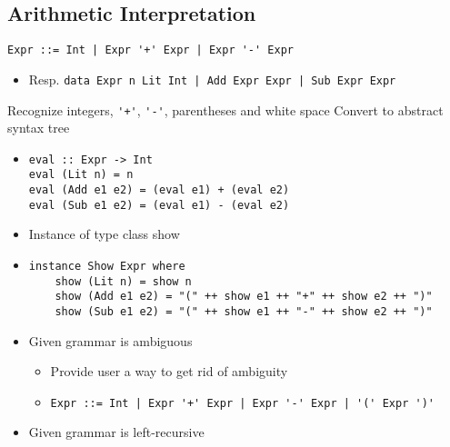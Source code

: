 \subsection{Arithmetic Interpretation}
\begin{itemize}
        \begin{itemize}
             \verb/Expr ::= Int | Expr '+' Expr | Expr '-' Expr/
                \begin{itemize}
                    \item Resp. \verb+data Expr n Lit Int | Add Expr Expr | Sub Expr Expr+
                \end{itemize}
             Recognize integers, \verb/'+'/, \verb/'-'/, parentheses and white space
             Convert to abstract syntax tree
        \end{itemize}
        \begin{itemize}
            \item
\begin{verbatim}
eval :: Expr -> Int
eval (Lit n) = n
eval (Add e1 e2) = (eval e1) + (eval e2)
eval (Sub e1 e2) = (eval e1) - (eval e2)
\end{verbatim}
        \end{itemize}
        \begin{itemize}
            \item Instance of type class show
            \item
\begin{verbatim}
instance Show Expr where
    show (Lit n) = show n
    show (Add e1 e2) = "(" ++ show e1 ++ "+" ++ show e2 ++ ")"
    show (Sub e1 e2) = "(" ++ show e1 ++ "-" ++ show e2 ++ ")"
\end{verbatim}
        \end{itemize}
        \begin{itemize}
            \item Given grammar is ambiguous
                \begin{itemize}
                    \item Provide user a way to get rid of ambiguity
                    \item \verb/Expr ::= Int | Expr '+' Expr | Expr '-' Expr | '(' Expr ')'/
                \end{itemize}
            \item Given grammar is left-recursive
                \begin{itemize}

\end{itemize}
\end{itemize}
\end{itemize}
